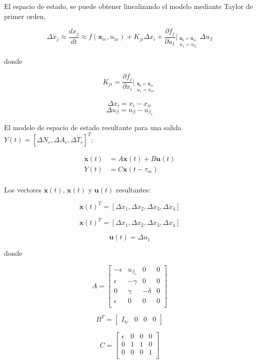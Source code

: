 \documentclass[journal]{IEEEtran}
\begin{document}
El espacio de estado, se puede obtener linealizando el modelo mediante Taylor de primer orden,

$$
\Delta\dot x_j \approx \frac{dx_j}{dt} \approx f(\mathbf{x}_{ie}, u_{1e}) + K_{ji}  \Delta x_i + \frac{\partial f_j}{\partial u_1} \Bigg|_{\substack{\mathbf{x_i}=\mathbf{x}_{ie} \\ u_1 =u_{\beta_e}}} \Delta u_{\beta} 
$$

donde

$$ K_{ji} = \frac{\partial f_j}{\partial x_i} \Bigg|_{\substack{\mathbf{x_i}=\mathbf{x}_{ie} \\ u_1 =u_{1e}}}
$$

$$\Delta x_i = x_i - x_{ie}$$
$$\Delta u_{\beta} = u_{\beta} - u_{\beta_e}$$

El modelo de espacio de estado resultante para una salida $Y(t)=[\Delta\dot N_r,  \Delta\dot A_r,  \Delta\dot T_r  ]^T$:


\begin{align*}
\dot{\mathbf{x}}(t) & = A\mathbf{x}(t) + B\mathbf{u}(t) \\
Y(t) & = C\mathbf{x}(t-\tau_m) \\
\end{align*}


Los vectores $\dot{\mathbf{x}}(t)$, $\mathbf{x}(t)$ y $\mathbf{u}(t)$ resultantes:

$$
\dot{\mathbf{x}}(t)^T = [\Delta  \dot{x}_1, \Delta \dot{x}_2, \Delta \dot{x}_3, \Delta \dot{x}_4]
$$

$$
{\mathbf{x}}(t)^T = [\Delta{x}_1, \Delta {x}_2, \Delta {x}_3, \Delta {x}_4]
$$

$$
{\mathbf{u}}(t) = \Delta u_1
$$

donde

$$
A = \begin{bmatrix}
-\epsilon & u_{\beta_{e}} & 0 & 0  \\
\epsilon & -\gamma & 0 & 0  \\
0 & \gamma  & -\delta & 0 \\
\epsilon & 0 & 0 & 0 \\
\end{bmatrix}
$$

$$
B^T = \begin{bmatrix}
I_{te} & 0 & 0 & 0
\end{bmatrix}
$$

$$
C = \begin{bmatrix}
\epsilon & 0 & 0 & 0  \\
0 & 1 & 1 & 0  \\
0 & 0  & 0 & 1 \\
\end{bmatrix}
$$
\end{document}

